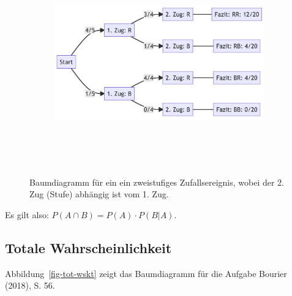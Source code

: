 \documentclass[
  a4paper,
  DIV=11]{scrreprt}
\theoremstyle{definition}
\theoremstyle{remark}
\begin{document}
\begin{figure}

{\centering 

\begin{figure}[H]

{\centering \includegraphics[width=5.5in,height=3.5in]{./Wskt_files/figure-latex/mermaid-figure-1.png}

}

\end{figure}

}

\caption{\label{fig-baum-abh}Baumdiagramm für ein ein zweistufiges
Zufallsereignis, wobei der 2. Zug (Stufe) abhängig ist vom 1. Zug.}

\end{figure}

Es gilt also: \(P(A\cap B) = P(A) \cdot P(B|A)\).

\hypertarget{totale-wahrscheinlichkeit}{%
\subsection{Totale Wahrscheinlichkeit}\label{totale-wahrscheinlichkeit}}

Abbildung~\ref{fig-tot-wskt} zeigt das Baumdiagramm für die Aufgabe
Bourier (2018), S. 56.
\end{document}

